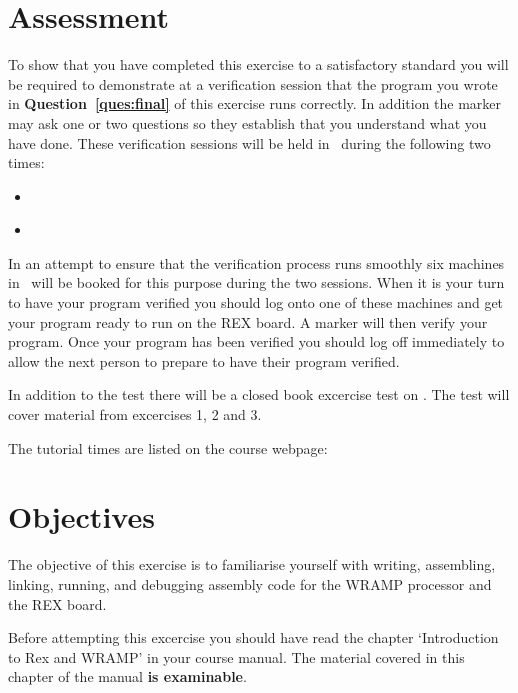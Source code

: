 \documentclass[a4paper,10pt]{article}
\begin{document}


\section{Assessment}
To show that you have completed this exercise to a satisfactory
standard you will be required to demonstrate at a verification session
that the program you wrote in \textbf{Question~\ref{ques:final}} 
of this exercise
runs correctly. In addition the marker may ask one or two questions so
they establish that you understand what you have done.  These
verification sessions will be held in \ASSESSROOM\ during the following two
times:

\begin{itemize}
\item \INTRODUE~\MORNINGASSESS
\item \INTRODUE~\AFTERNOONASSESS 
\end{itemize}

In an attempt to ensure that the verification process runs smoothly
six machines in \ASSESSROOM\ will be booked for this purpose during the two
sessions. When it is your turn to have your program verified you
should log onto one of these machines and get your program ready to
run on the REX board. A marker will then verify your program. Once
your program has been verified you should log off immediately to allow
the next person to prepare to have their program verified.

In addition to the test there will be a closed book excercise test on
\textbf{\TESTONE}.  The test will cover material 
from excercises 1, 2 and 3.

The tutorial times are listed on the course webpage:

\begin{center}
\src{\WEBPAGEBASE}
\end{center}

\section{Objectives}
The objective of this exercise is to familiarise 
yourself with writing, assembling, linking, running, and
debugging assembly code for the WRAMP processor and the REX board.

Before attempting this excercise you should have read the 
chapter `Introduction to Rex and WRAMP' in your course manual.  The material covered in this chapter of the manual \textbf{is examinable}.
\end{document}
